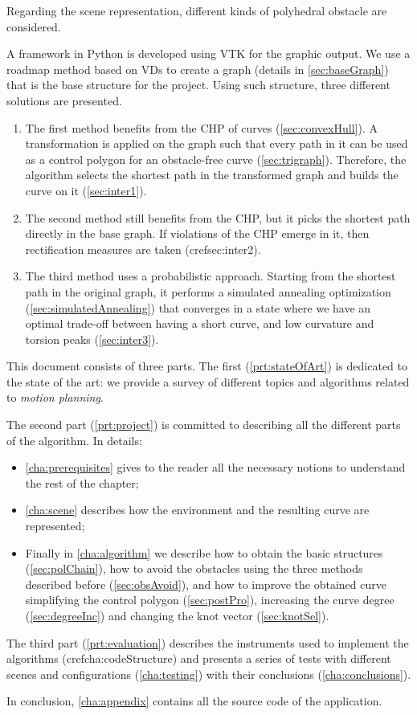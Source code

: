 \documentclass[dissertation.tex]{subfiles}
\begin{document}
Regarding the scene representation, different kinds of
polyhedral obstacle are considered.

A framework in Python is developed using \ac{VTK} for the graphic
output. We use a roadmap method based on \acp{VD} to create a
graph (details in
\cref{sec:baseGraph}) that is the base
structure for the project. Using such structure, three
different solutions are presented.
\begin{enumerate}
\item The first method benefits from the \acf{CHP} of \bs
  curves (\cref{sec:convexHull}). A transformation is applied on the
  graph such that every path in it can be used as a control polygon
  for an obstacle-free curve (\cref{sec:trigraph}). Therefore, the
  algorithm selects the shortest path in the transformed graph and
  builds the curve on it (\cref{sec:inter1}).
\item The second method still benefits from the \ac{CHP},
  but it picks the shortest path directly in the base graph. If
  violations of the \ac{CHP} emerge in it, then rectification
  measures are taken (cref{sec:inter2}).
\item The third method uses a probabilistic approach. Starting from
  the shortest path in the original graph, it performs a simulated
  annealing optimization (\cref{sec:simulatedAnnealing}) that converges
  in a state where we have an optimal trade-off between having a short curve,
  and low curvature and torsion peaks (\cref{sec:inter3}).
\end{enumerate}

This document consists of three parts. The first
(\cref{prt:stateOfArt})
is dedicated to the state of the art: we provide a survey of
different topics and algorithms related to \emph{motion planning}.

The
second part (\cref{prt:project}) is committed to describing
all the different parts of the algorithm. In details:
\begin{itemize}
\item \cref{cha:prerequisites} gives to the reader all the necessary notions
  to understand the rest of the chapter;
\item \cref{cha:scene} describes how the
  environment and the resulting curve are represented;
\item Finally in
\cref{cha:algorithm} we describe how to obtain the basic structures
(\cref{sec:polChain}), how to avoid the obstacles using the three
methods described before (\cref{sec:obsAvoid}), and how to improve the
obtained curve simplifying the control polygon (\cref{sec:postPro}),
increasing the curve degree (\cref{sec:degreeInc}) and changing the
\bs knot vector (\cref{sec:knotSel}).
\end{itemize}

The third part (\cref{prt:evaluation}) describes the instruments used
to implement the algorithms (cref{cha:codeStructure}) and presents
a series of tests with
different scenes and configurations (\cref{cha:testing}) with their
conclusions (\cref{cha:conclusions}).

In conclusion, \cref{cha:appendix} contains all the source code of the
application.
\end{document}
